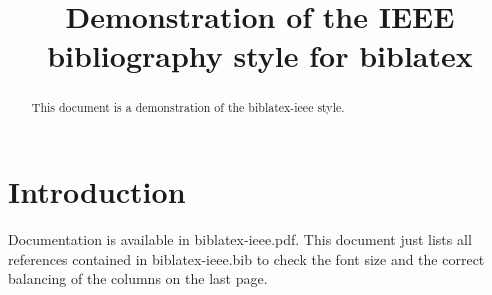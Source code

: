 \documentclass[conference,compsoc]{IEEEtran}
\providecommand*{\pkg}[1]{\textsf{#1}}
\begin{document}
\title{Demonstration of the \pkg{IEEE} bibliography style for \pkg{biblatex}}
\author{
}
\maketitle
\IEEEpeerreviewmaketitle

\begin{abstract}
This document is a demonstration of the biblatex-ieee style.
\end{abstract}

\section{Introduction}
Documentation is available in \pkg{biblatex-ieee.pdf}.
This document just lists all references contained in \pkg{biblatex-ieee.bib} to check the font size and the correct balancing of the columns on the last page.

\nocite{*}

\printbibliography

\balance
\end{document}
